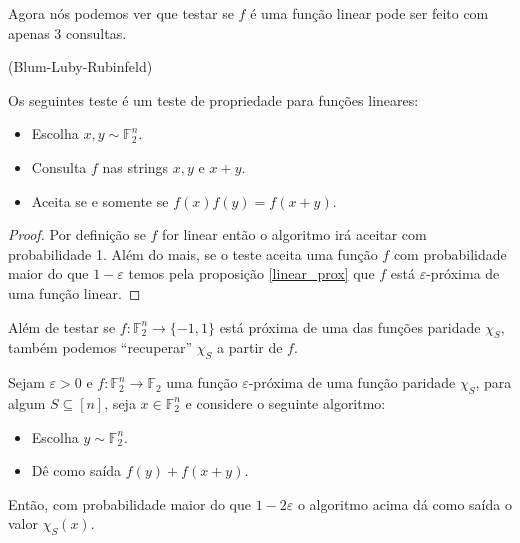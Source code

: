 Agora nós podemos ver que testar se $f$ é uma função linear pode ser feito com apenas 3 consultas.

\begin{teo} (Blum-Luby-Rubinfeld) \label{BLR_test}

Os seguintes teste é um teste de propriedade para funções lineares:

\begin{itemize}

	\item Escolha $x, y \sim \mathbb{F}_{2}^{n}$.
	
	\item Consulta $f$ nas strings $x, y$ e $x + y$.
	
	\item Aceita se e somente se $f(x)f(y) = f(x + y)$.

\end{itemize}

\end{teo}

\begin{proof}

Por definição se $f$ for linear então o algoritmo irá aceitar com probabilidade 1. Além do mais, se o teste aceita uma função $f$ com probabilidade maior do que $1 - \varepsilon$ temos pela proposição \ref{linear_prox} que $f$ está $\varepsilon$-próxima de uma função linear.

\end{proof}

Além de testar se $f: \mathbb{F}_{2}^{n} \to \{-1, 1\}$ está próxima de uma das funções paridade $\chi_{S}$, também podemos ``recuperar'' $\chi_{S}$ a partir de $f$.

\begin{teo} \label{local_correcting_routine}

Sejam $\varepsilon > 0$ e $f: \mathbb{F}_{2}^{n} \to \mathbb{F}_{2}$ uma função $\varepsilon$-próxima de uma função paridade $\chi_{S}$, para algum $S \subseteq [n]$, seja $x \in \mathbb{F}_{2}^{n}$ e considere o seguinte algoritmo: 

\begin{itemize}

	\item Escolha $y \sim \mathbb{F}_{2}^{n}$.
	
	\item Dê como saída $f(y) + f(x + y)$.

\end{itemize}

Então, com probabilidade maior do que $1 - 2\varepsilon$ o algoritmo acima dá como saída o valor $\chi_{S}(x)$.

\end{teo}

